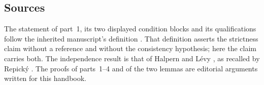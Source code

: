 \subsection{Sources}
\label{sec:p01-w02-p01-009-sources}

The statement of part~1, its two displayed condition blocks and its
qualifications follow the inherited manuscript's definition
\cite[ch.~``Sets, Relations, Functions, and Cardinality'', sec.~``Choice
principles used later'', definition ``Ultrafilter Lemma'']{FrozenFormalLogicUltrafilterLemma}.
That definition asserts the strictness claim without a reference and without
the consistency hypothesis; here the claim carries both. The independence
result is that of Halpern and L\'evy \cite{HalpernLevy1971}, as recalled by
Repick\'y \cite[p.~543, Theorem~1]{Repicky2015BPI}. The proofs of
parts~1--4 and of the two lemmas are editorial arguments written for this
handbook.
